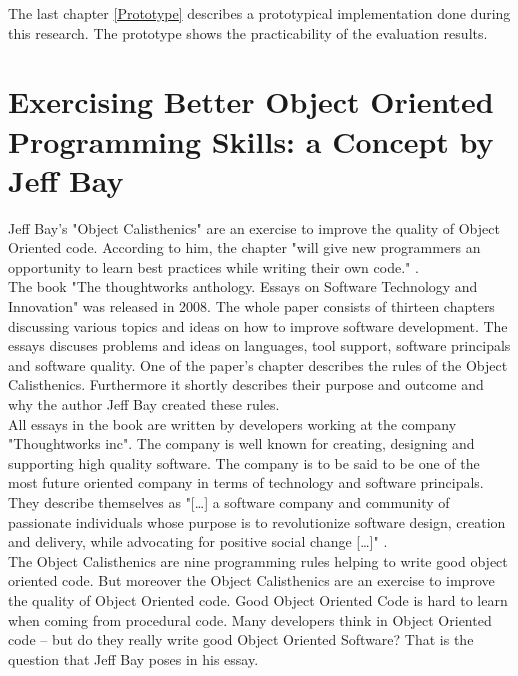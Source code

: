The last chapter \ref{Prototype} describes a prototypical implementation done during this research. The prototype shows the practicability of the evaluation results.

\section{Exercising Better Object Oriented Programming Skills: a Concept by Jeff Bay}
\label{i:exercising}
Jeff Bay's "Object Calisthenics" \cite{bay2008} are an exercise to improve the quality of Object Oriented code. According to him, the chapter "will give new programmers an opportunity to learn best practices while writing their own code." \cite[p. 70]{bay2008}.\\

The book "The thoughtworks anthology. Essays on Software Technology and Innovation"\cite[p. 70-79]{oc2008} was released in 2008. The whole paper consists of thirteen chapters discussing various topics and ideas on how to improve software development. The essays discuses problems and ideas on languages, tool support, software principals and software quality. One of the paper's chapter describes the rules of the Object Calisthenics. Furthermore it shortly describes their purpose and outcome and why the author Jeff Bay created these rules.\\

All essays in the book \cite{oc2008} are written by developers working at the company "Thoughtworks inc". The company is well known for creating, designing and supporting high quality software. The company is to be said to be one of the most future oriented company in terms of technology and software principals. They describe themselves as "[\dots] a software company and community of passionate individuals whose purpose is to revolutionize software design, creation and delivery, while advocating for positive social change [\dots]" \cite{twWeb}.\\

The Object Calisthenics are nine programming rules helping to write good object oriented code. But moreover the Object Calisthenics are an exercise to improve the quality of Object Oriented code. Good Object Oriented Code is hard to learn when coming from procedural code. Many developers think in Object Oriented code – but do they really write good Object Oriented Software? That is the question that Jeff Bay poses in his essay.\\

